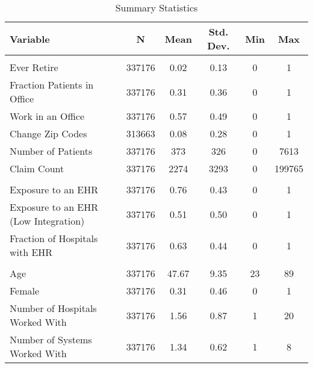 


\begin{table}[p]
\caption{Summary Statistics}
\centering
\begin{tabular}[t]{lccccc}
\toprule
Variable & N & Mean & Std. Dev. & Min & Max\\
\midrule
\addlinespace[0.3em]
\multicolumn{6}{l}{\textbf{Outcomes}}\\
\hspace{1em}Ever Retire & 337176 & 0.02 & 0.13 & 0 & 1\\
\hspace{1em}Fraction Patients in Office & 337176 & 0.31 & 0.36 & 0 & 1\\
\hspace{1em}Work in an Office & 337176 & 0.57 & 0.49 & 0 & 1\\
\hspace{1em}Change Zip Codes & 313663 & 0.08 & 0.28 & 0 & 1\\
\hspace{1em}Number of Patients & 337176 & 373 & 326 & 0 & 7613\\
\hspace{1em}Claim Count & 337176 & 2274 & 3293 & 0 & 199765\\
\addlinespace[0.3em]
\multicolumn{6}{l}{\textbf{Treatment}}\\
\hspace{1em}Exposure to an EHR & 337176 & 0.76 & 0.43 & 0 & 1\\
\hspace{1em}Exposure to an EHR (Low Integration) & 337176 & 0.51 & 0.50 & 0 & 1\\
\hspace{1em}Fraction of Hospitals with EHR & 337176 & 0.63 & 0.44 & 0 & 1\\
\addlinespace[0.3em]
\multicolumn{6}{l}{\textbf{Characteristics}}\\
\hspace{1em}Age & 337176 & 47.67 & 9.35 & 23 & 89\\
\hspace{1em}Female & 337176 & 0.31 & 0.46 & 0 & 1\\
\hspace{1em}Number of Hospitals Worked With & 337176 & 1.56 & 0.87 & 1 & 20\\
\hspace{1em}Number of Systems Worked With & 337176 & 1.34 & 0.62 & 1 & 8\\
\bottomrule
\end{tabular}
\label{tab:sumstats1}
\end{table}